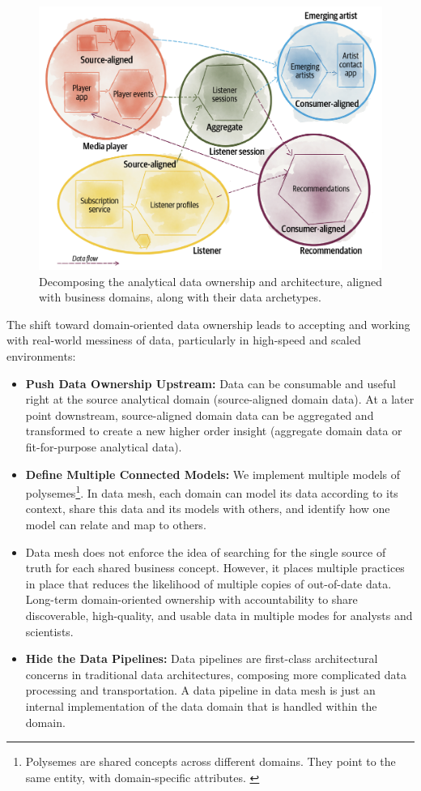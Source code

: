 \documentclass[12pt, a4paper]{book}
\begin{document}
\begin{figure}[h]
	\begin{framed}
		\centering
		\includegraphics[width=12cm]{DecomposeData.png}
		\caption{Decomposing the analytical data ownership and architecture, aligned with business domains, along with their data archetypes.}
		\label{DecomposeData}
	\end{framed}
\end{figure}

The shift toward domain-oriented data ownership leads to accepting and working with real-world messiness of data, particularly in high-speed and scaled environments:
	\begin{itemize}
		\item \textbf{Push Data Ownership Upstream:} Data can be consumable and useful right at the source analytical domain (source-aligned domain data). At a later point downstream, source-aligned domain data can be aggregated and transformed to create a new higher order insight (aggregate domain data or fit-for-purpose analytical data).
		\item \textbf{Define Multiple Connected Models:} We implement multiple models of polysemes\footnote{Polysemes are shared concepts across different domains. They point to the same entity, with domain-specific attributes. \cite{datamesh2022ch2}}. In data mesh, each domain can model its data according to its context, share this data and its models with others, and identify how one model can relate and map to others.
		\item Data mesh does not enforce the idea of searching for the single source of truth for each shared business concept. However, it places multiple practices in place that reduces the likelihood of multiple copies of out-of-date data. Long-term domain-oriented ownership with accountability to share discoverable, high-quality, and usable data in multiple modes for analysts and scientists.
		\item \textbf{Hide the Data Pipelines:} Data pipelines are first-class architectural concerns in traditional data architectures, composing more complicated data processing and transportation. A data pipeline in data mesh is just an internal implementation of the data domain that is handled within the domain.
	\end{itemize}
\end{document}
